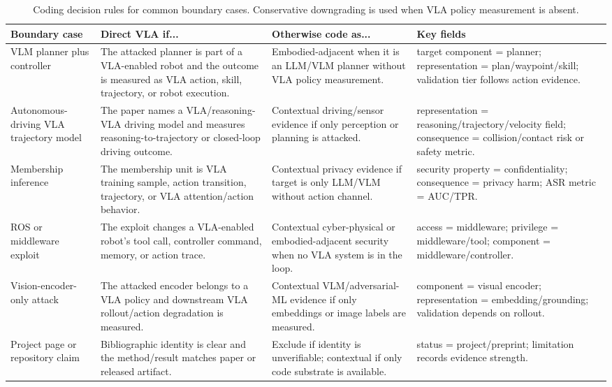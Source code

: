 \begin{table}[t]
\centering
\scriptsize
\caption{Coding decision rules for common boundary cases. Conservative downgrading is used when VLA policy measurement is absent.}
\label{tab:coding-decision-tree}
\renewcommand{\arraystretch}{1.08}
\setlength{\tabcolsep}{2.2pt}
\begin{tabularx}{\textwidth}{@{}p{}Y Y Y@{}}
\toprule
\textbf{Boundary case} & \textbf{Direct VLA if...} & \textbf{Otherwise code as...} & \textbf{Key fields} \\
\midrule
VLM planner plus controller & The attacked planner is part of a VLA-enabled robot and the outcome is measured as VLA action, skill, trajectory, or robot execution. & Embodied-adjacent when it is an LLM/VLM planner without VLA policy measurement. & target component = planner; representation = plan/waypoint/skill; validation tier follows action evidence. \\
Autonomous-driving VLA trajectory model & The paper names a VLA/reasoning-VLA driving model and measures reasoning-to-trajectory or closed-loop driving outcome. & Contextual driving/sensor evidence if only perception or planning is attacked. & representation = reasoning/trajectory/velocity field; consequence = collision/contact risk or safety metric. \\
Membership inference & The membership unit is VLA training sample, action transition, trajectory, or VLA attention/action behavior. & Contextual privacy evidence if target is only LLM/VLM without action channel. & security property = confidentiality; consequence = privacy harm; ASR metric = AUC/TPR. \\
ROS or middleware exploit & The exploit changes a VLA-enabled robot's tool call, controller command, memory, or action trace. & Contextual cyber-physical or embodied-adjacent security when no VLA system is in the loop. & access = middleware; privilege = middleware/tool; component = middleware/controller. \\
Vision-encoder-only attack & The attacked encoder belongs to a VLA policy and downstream VLA rollout/action degradation is measured. & Contextual VLM/adversarial-ML evidence if only embeddings or image labels are measured. & component = visual encoder; representation = embedding/grounding; validation depends on rollout. \\
Project page or repository claim & Bibliographic identity is clear and the method/result matches paper or released artifact. & Exclude if identity is unverifiable; contextual if only code substrate is available. & status = project/preprint; limitation records evidence strength. \\
\bottomrule
\end{tabularx}
\end{table}

